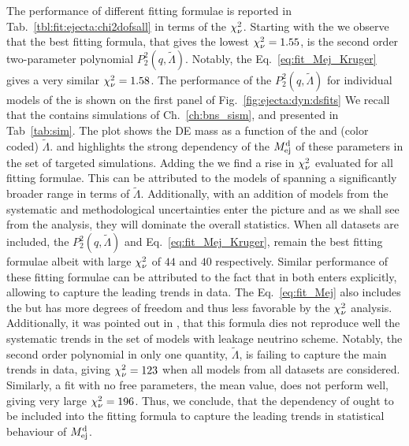 The performance of different fitting formulae is reported in  
Tab.~\ref{tbl:fit:ejecta:chi2dofsall} in terms of the $\chi_{\nu}^2$.
%
Starting with the \DSrefset{} we observe that the best fitting formula, that gives the 
lowest $\chi_{\nu}^2=1.55$, is the second order two-parameter polynomial $P_2^2(q,\tilde{\Lambda})$.
Notably, the Eq.~\eqref{eq:fit_Mej_Kruger} gives a very similar $\chi_{\nu}^2=1.58$.
%
The performance of the $P_2^2(q,\tilde{\Lambda})$ for individual models of the \DSrefset{} 
is shown on the first panel of Fig.~\ref{fig:ejecta:dyn:dsfits}
%
We recall that the \DSrefset{} contains simulations of Ch.~\ref{ch:bns_sism}, and presented 
in Tab~\ref{tab:sim}. 
The plot shows the \ac{DE} mass as a function of the \mr{} and (color coded) $\tilde\Lambda$.
and highlights the strong dependency of the $M^{\text{d}}_{\text{ej}}$ of these parameters in the set of targeted 
simulations. 
%
%
Adding the \DSheatcool{} we find a rise in $\chi_{\nu}^2$ evaluated for all fitting formulae. 
This can be attributed to the models of \DSheatcool{} spanning a significantly broader range 
in terms of $\tilde{\Lambda}$. Additionally, with an addition of models from \DSheatcool{} 
the systematic and methodological uncertainties enter the picture and as we shall see from 
the analysis, they will dominate the overall statistics.
%
When all datasets are included, the $P_2^2(q,\tilde{\Lambda})$ and 
Eq.~\eqref{eq:fit_Mej_Kruger}, remain the best fitting formulae albeit with large 
$\chi_{\nu}^2$ of $44$ and $40$ respectively.
%
Similar performance of these fitting formulae can be attributed to the fact that in 
both \mr{} enters explicitly, allowing to capture the leading trends in data.
The Eq.~\eqref{eq:fit_Mej} also includes the \mr{} but has more degrees of freedom and 
thus less favorable by the $\chi_{\nu}^2$ analysis. Additionally, it was pointed out in 
\citet{Radice:2018pdn}, that this formula dies not reproduce well the systematic 
trends in the set of models with leakage neutrino scheme.
%
Notably, the second order polynomial in only one quantity, $\tilde{\Lambda}$, is failing to 
capture the main trends in data, giving $\chi_{\nu}^2=123$ when all models from all datasets are 
considered. Similarly, a fit with no free parameters, the mean value, does not perform well, 
giving very large $\chi_{\nu}^2=196$.
%
Thus, we conclude, that the dependency of \mr{} ought to be included into the fitting 
formula to capture the leading trends in statistical behaviour of $M^{\text{d}}_{\text{ej}}$.


